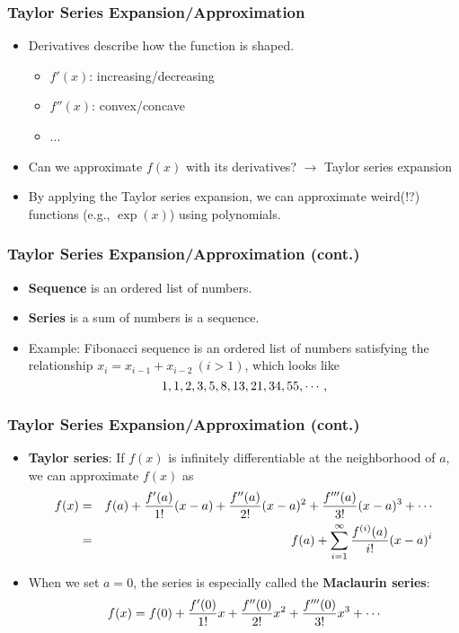 \documentclass[pdflatex, 12pt]{beamer}
\begin{document}
\begin{frame}
\frametitle{Taylor Series Expansion/Approximation}
\begin{itemize}
\item Derivatives describe how the function is shaped.
 \begin{itemize}
 \item $f'(x)$: increasing/decreasing
 \item $f''(x)$: convex/concave
 \item ...
 \end{itemize}
\vspace{0.4cm}
\item Can we approximate $f(x)$ with its derivatives? $\rightarrow$ Taylor series expansion
\vspace{0.4cm}
\item By applying the Taylor series expansion, we can approximate weird(!?) functions (e.g., $\exp(x)$) using polynomials. 
\end{itemize}
\end{frame}

\begin{frame}
\frametitle{Taylor Series Expansion/Approximation (cont.)}
\begin{itemize}
\item \textbf{Sequence} is an ordered list of numbers.
\vspace{0.4cm}
\item \textbf{Series} is a sum of numbers is a sequence.
\vspace{0.4cm}
\item Example: Fibonacci sequence is an ordered list of numbers satisfying the relationship $x_{i} = x_{i - 1} + x_{i - 2} \ (i > 1)$, which looks like
 \begin{equation}
 1, 1, 2, 3, 5, 8, 13, 21, 34, 55, \cdots, \notag
 \end{equation}
\end{itemize}
\end{frame}

\begin{frame}
\frametitle{Taylor Series Expansion/Approximation (cont.)}
\begin{itemize}
\item \textbf{Taylor series}: If $f(x)$ is infinitely differentiable at the neighborhood of $a$, we can approximate $f(x)$ as 
 {\footnotesize
 \begin{eqnarray}
 f(x) &=& f(a) + \frac{f'(a)}{1!}(x - a) + \frac{f''(a)}{2!}(x - a)^2 + \frac{f'''(a)}{3!}(x - a)^3 + \cdots \notag \\
 &=& f(a) + \sum_{i = 1}^{\infty} \frac{f^{(i)} (a)}{i!}(x - a)^i \notag
 \end{eqnarray}
 }
\vspace{0.2cm}
\item When we set $a = 0$, the series is especially called the \textbf{Maclaurin series}:
 {\footnotesize
 \begin{equation}
 f(x) = f(0) + \frac{f'(0)}{1!}x + \frac{f''(0)}{2!}x^2 + \frac{f'''(0)}{3!}x^3 + \cdots \notag
 \end{equation}
 }
\end{itemize}
\end{frame}
\end{document}
